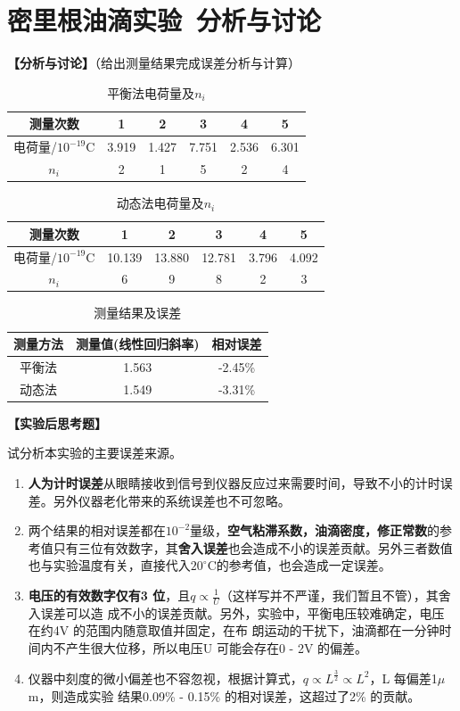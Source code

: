 \documentclass[dvipsnames, svgnames,a4paper,11pt]{article}
\begin{document}
\section{密里根油滴实验\ \textbf{分析与讨论}}
\textbf{【分析与讨论】}（给出测量结果完成误差分析与计算）
\begin{table}[H]
	\centering
	\begin{tabular}{cccccc}
		\toprule
		测量次数& 1 & 2 & 3&4&5\\
		\midrule
		电荷量/$10^{-19}$C & 3.919&1.427 & 7.751&2.536&6.301 \\
		$n_i$&2&1&5&2&4\\
		\bottomrule
	\end{tabular}
	 \caption{平衡法电荷量及$n_i$}
\end{table}
\begin{table}[H]
	\centering
	\begin{tabular}{cccccc}
		\toprule
		测量次数& 1 & 2 & 3&4&5\\
		\midrule
		电荷量/$10^{-19}$C & 10.139&13.880 & 12.781&3.796&4.092 \\
		$n_i$&6&9&8&2&3\\
		\bottomrule
	\end{tabular}
	 \caption{动态法电荷量及$n_i$}
\end{table}
\begin{table}[H]
	\centering
	\begin{tabular}{ccc}
		\toprule
		测量方法&测量值(线性回归斜率)&相对误差\\
		\midrule
		平衡法 & 1.563&-2.45\% \\
		动态法&1.549&-3.31\%\\
		\bottomrule
	\end{tabular}
	 \caption{测量结果及误差}
\end{table}
\textbf{【实验后思考题】}
\begin{question}
	试分析本实验的主要误差来源。
	\tcblower
	\begin{enumerate}
		\item \textbf{人为计时误差}从眼睛接收到信号到仪器反应过来需要时间，导致不小的计时误差。另外仪器老化带来的系统误差也不可忽略。
		\item 两个结果的相对误差都在$10^{-2}$量级，\textbf{空气粘滞系数，油滴密度，修正常数}的参考值只有三位有效数字，其\textbf{舍入误差}也会造成不小的误差贡献。另外三者数值也与实验温度有关，直接代入$20^\circ \text{C}$的参考值，也会造成一定误差。
		\item \textbf{电压的有效数字仅有3 位}，且$q\propto \frac{1}{U}$（这样写并不严谨，我们暂且不管），其舍入误差可以造
		成不小的误差贡献。另外，实验中，平衡电压较难确定，电压在约4V 的范围内随意取值并固定，在布
		朗运动的干扰下，油滴都在一分钟时间内不产生很大位移，所以电压U 可能会存在0 - 2V 的偏差。
		\item 仪器中刻度的微小偏差也不容忽视，根据计算式，$q \propto L^{\frac{3}{2}}\propto L^2$，L 每偏差1$\mu$m，则造成实验
		结果0.09\% - 0.15\% 的相对误差，这超过了2\% 的贡献。
	\end{enumerate}
\end{question}
\end{document}
